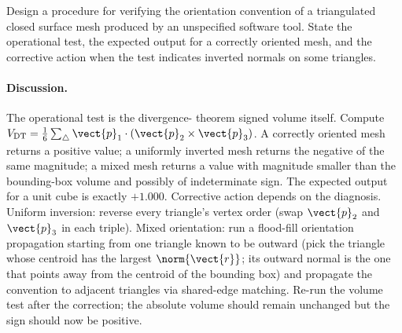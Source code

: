 \begin{exercise}
Design a procedure for verifying the orientation convention of a
triangulated closed surface mesh produced by an unspecified
software tool. State the operational test, the expected output for
a correctly oriented mesh, and the corrective action when the test
indicates inverted normals on some triangles.

\paragraph{Discussion.} The operational test is the divergence-
theorem signed volume itself. Compute $V_{\text{DT}} = \tfrac{1}{6}
\sum_{\triangle}\vect{p}_{1}\cdot(\vect{p}_{2}\times\vect{p}_{3})$.
A correctly oriented mesh returns a positive value; a uniformly
inverted mesh returns the negative of the same magnitude; a mixed
mesh returns a value with magnitude smaller than the bounding-box
volume and possibly of indeterminate sign. The expected output for
a unit cube is exactly $+1.000$. Corrective action depends on the
diagnosis. Uniform inversion: reverse every triangle's vertex order
(swap $\vect{p}_{2}$ and $\vect{p}_{3}$ in each triple). Mixed
orientation: run a flood-fill orientation propagation starting from
one triangle known to be outward (pick the triangle whose centroid
has the largest $\norm{\vect{r}}$; its outward normal is the one
that points away from the centroid of the bounding box) and
propagate the convention to adjacent triangles via shared-edge
matching. Re-run the volume test after the correction; the
absolute volume should remain unchanged but the sign should now be
positive.
\end{exercise}

